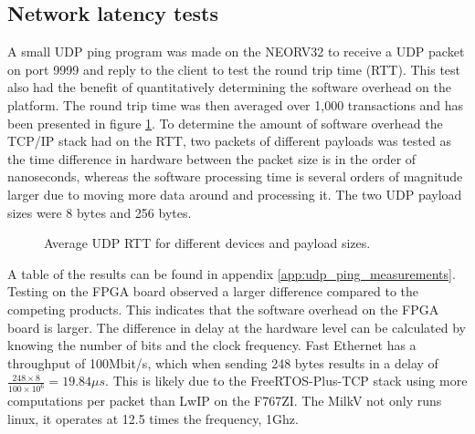 \subsection{Network latency tests}


A small UDP ping program was made on the NEORV32 to receive a UDP packet on port 9999 and reply to the client to test the round trip time (RTT). This test also had the benefit of quantitatively determining the software overhead on the platform. The round trip time was then averaged over 1,000 transactions and has been presented in figure \ref{fig:avg_udp_rtt}. To determine the amount of software overhead the TCP/IP stack had on the RTT, two packets of different payloads was tested as the time difference in hardware between the packet size is in the order of nanoseconds, whereas the software processing time is several orders of magnitude larger due to moving more data around and processing it. The two UDP payload sizes were 8 bytes and 256 bytes.


\begin{figure}[ht]
    \centering
    \caption{Average UDP RTT for different devices and payload sizes.}
    \label{fig:avg_udp_rtt}
    \end{figure}
    
A table of the results can be found in appendix \ref{app:udp_ping_measurements}. Testing on the FPGA board observed a larger difference compared to the competing products. This indicates that the software overhead on the FPGA board is larger. The difference in delay at the hardware level can be calculated by knowing the number of bits and the clock frequency. Fast Ethernet has a throughput of 100Mbit/s, which when sending 248 bytes results in a delay of $\frac{248 \times 8}{100 \times 10^6}=19.84\mu s$. This is likely due to the FreeRTOS-Plus-TCP stack using more computations per packet than LwIP on the F767ZI. The MilkV not only runs linux, it operates at 12.5 times the frequency, 1Ghz.

